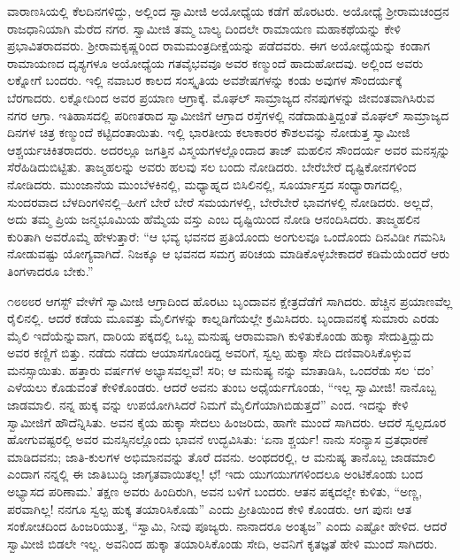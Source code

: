 ವಾರಾಣಸಿಯಲ್ಲಿ ಕೆಲದಿನಗಳಿದ್ದು, ಅಲ್ಲಿಂದ ಸ್ವಾಮೀಜಿ ಅಯೋಧ್ಯೆಯ ಕಡೆಗೆ ಹೊರಟರು. ಅಯೋಧ್ಯೆ ಶ್ರೀರಾಮಚಂದ್ರನ ರಾಜಧಾನಿಯಾಗಿ ಮೆರೆದ ನಗರ. ಸ್ವಾಮೀಜಿ ತಮ್ಮ ಬಾಲ್ಯ ದಿಂದಲೇ ರಾಮಾಯಣ ಮಹಾಕಥೆಯನ್ನು ಕೇಳಿ ಪ್ರಭಾವಿತರಾದವರು. ಶ್ರೀರಾಮಕೃಷ್ಣರಿಂದ ರಾಮಮಂತ್ರದೀಕ್ಷೆಯನ್ನು ಪಡೆದವರು. ಈಗ ಅಯೋಧ್ಯೆಯನ್ನು ಕಂಡಾಗ ರಾಮಾಯಣದ ದೃಶ್ಯಗಳೂ ಅಯೋಧ್ಯೆಯ ಗತವೈಭವವೂ ಅವರ ಕಣ್ಮುಂದೆ ಹಾದುಹೋದವು. ಅಲ್ಲಿಂದ ಅವರು ಲಕ್ನೋಗೆ ಬಂದರು. ಇಲ್ಲಿ ನವಾಬರ ಕಾಲದ ಸಂಸ್ಕೃತಿಯ ಅವಶೇಷಗಳನ್ನು ಕಂಡು ಅವುಗಳ ಸೌಂದರ್ಯಕ್ಕೆ ಬೆರಗಾದರು. ಲಕ್ನೋದಿಂದ ಅವರ ಪ್ರಯಾಣ ಆಗ್ರಾಕ್ಕೆ. ಮೊಘಲ್ ಸಾಮ್ರಾಜ್ಯದ ನೆನಪುಗಳನ್ನು ಜೀವಂತವಾಗಿಸಿರುವ ನಗರ ಆಗ್ರಾ. ಇತಿಹಾಸದಲ್ಲಿ ಪರಿಣತರಾದ ಸ್ವಾಮೀಜಿಗೆ ಆಗ್ರಾದ ರಸ್ತೆಗಳಲ್ಲಿ ನಡೆದಾಡುತ್ತಿದ್ದಂತೆ ಮೊಘಲ್ ಸಾಮ್ರಾಜ್ಯದ ದಿನಗಳ ಚಿತ್ರ ಕಣ್ಮುಂದೆ ಕಟ್ಟಿದಂತಾಯಿತು. ಇಲ್ಲಿ ಭಾರತೀಯ ಕಲಾಕಾರರ ಕೌಶಲವನ್ನು ನೋಡುತ್ತ ಸ್ವಾಮೀಜಿ ಆಶ್ಚರ್ಯಚಿಕಿತರಾದರು. ಅದರಲ್ಲೂ ಜಗತ್ತಿನ ವಿಸ್ಮಯಗಳಲ್ಲೊಂದಾದ ತಾಜ್ ಮಹಲಿನ ಸೌಂದರ್ಯ ಅವರ ಮನಸ್ಸನ್ನು ಸೆರೆಹಿಡಿದುಬಿಟ್ಟಿತು. ತಾಜ್ಮಹಲನ್ನು ಅವರು ಹಲವು ಸಲ ಬಂದು ನೋಡಿದರು. ಬೇರೆಬೇರೆ ದೃಷ್ಟಿಕೋನಗಳಿಂದ ನೋಡಿದರು. ಮುಂಜಾನೆಯ ಮುಂಬೆಳಕಿನಲ್ಲಿ, ಮಧ್ಯಾಹ್ನದ ಬಿಸಿಲಿನಲ್ಲಿ, ಸೂರ್ಯಾಸ್ತದ ಸಂಧ್ಯಾರಾಗದಲ್ಲಿ, ಸುಂದರವಾದ ಬೆಳದಿಂಗಳಿನಲ್ಲಿ–ಹೀಗೆ ಬೇರೆ ಬೇರೆ ಸಮಯಗಳಲ್ಲಿ, ಬೇರೆಬೇರೆ ಭಾವಗಳಲ್ಲಿ ನೋಡಿದರು. ಅಲ್ಲದೆ, ಅದು ತಮ್ಮ ಪ್ರಿಯ ಜನ್ಮಭೂಮಿಯ ಹೆಮ್ಮೆಯ ವಸ್ತು ಎಂಬ ದೃಷ್ಟಿಯಿಂದ ನೋಡಿ ಆನಂದಿಸಿದರು. ತಾಜ್ಮಹಲಿನ ಕುರಿತಾಗಿ ಅವರೊಮ್ಮೆ ಹೇಳುತ್ತಾರೆ: “ಆ ಭವ್ಯ ಭವನದ ಪ್ರತಿಯೊಂದು ಅಂಗುಲವೂ ಒಂದೊಂದು ದಿನವಿಡೀ ಗಮನಿಸಿ ನೋಡುವಷ್ಟು ಯೋಗ್ಯವಾಗಿದೆ. ನಿಜಕ್ಕೂ ಆ ಭವನದ ಸಮಗ್ರ ಪರಿಚಯ ಮಾಡಿಕೊಳ್ಳಬೇಕಾದರೆ ಕಡಿಮೆಯೆಂದರೆ ಆರು ತಿಂಗಳಾದರೂ ಬೇಕು.”

೧೮೮೮ರ ಆಗಸ್ಟ್ ವೇಳೆಗೆ ಸ್ವಾಮೀಜಿ ಆಗ್ರಾದಿಂದ ಹೊರಟು ಬೃಂದಾವನ ಕ್ಷೇತ್ರದೆಡೆಗೆ ಸಾಗಿದರು. ಹೆಚ್ಚಿನ ಪ್ರಯಾಣವೆಲ್ಲ ರೈಲಿನಲ್ಲಿ. ಆದರೆ ಕಡೆಯ ಮೂವತ್ತು ಮೈಲಿಗಳನ್ನು ಕಾಲ್ನಡಿಗೆಯಲ್ಲೇ ಕ್ರಮಿಸಿದರು. ಬೃಂದಾವನಕ್ಕೆ ಸುಮಾರು ಎರಡು ಮೈಲಿ ಇದೆಯೆನ್ನುವಾಗ, ದಾರಿಯ ಪಕ್ಕದಲ್ಲಿ ಒಬ್ಬ ಮನುಷ್ಯ ಆರಾಮವಾಗಿ ಕುಳಿತುಕೊಂಡು ಹುಕ್ಕಾ ಸೇದುತ್ತಿದ್ದುದು ಅವರ ಕಣ್ಣಿಗೆ ಬಿತ್ತು. ನಡೆದು ನಡೆದು ಆಯಾಸಗೊಂಡಿದ್ದ ಅವರಿಗೆ, ಸ್ವಲ್ಪ ಹುಕ್ಕಾ ಸೇದಿ ದಣಿವಾರಿಸಿಕೊಳ್ಳುವ ಮನಸ್ಸಾಯಿತು. ಹತ್ತಾರು ವರ್ಷಗಳ ಅಭ್ಯಾಸವಲ್ಲವೆ! ಸರಿ; ಆ ಮನುಷ್ಯ ನನ್ನು ಮಾತಾಡಿಸಿ, ಒಂದರೆಡು ಸಲ ‘ದಂ’ ಎಳೆಯಲು ಕೊಡುವಂತೆ ಕೇಳಿಕೊಂಡರು. ಆದರೆ ಅವನು ತುಂಬ ಅಧೈರ್ಯಗೊಂಡು, “ಇಲ್ಲ ಸ್ವಾಮೀಜಿ! ನಾನೊಬ್ಬ ಜಾಡಮಾಲಿ. ನನ್ನ ಹುಕ್ಕ ವನ್ನು ಉಪಯೋಗಿಸಿದರೆ ನಿಮಗೆ ಮೈಲಿಗೆಯಾಗಿಬಿಡುತ್ತದೆ” ಎಂದ. ಇದನ್ನು ಕೇಳಿ ಸ್ವಾಮೀಜಿಗೆ ಹೌದೆನ್ನಿಸಿತು. ಅವನ ಕೈಯ ಹುಕ್ಕಾ ಸೇದಲು ಹಿಂಜರಿದು, ಹಾಗೇ ಮುಂದೆ ಸಾಗಿದರು. ಆದರೆ ಸ್ವಲ್ಪದೂರ ಹೋಗುವಷ್ಟರಲ್ಲಿ ಅವರ ಮನಸ್ಸಿನಲ್ಲೊಂದು ಭಾವನೆ ಉದ್ಭವಿಸಿತು: ‘ಏನಾ ಶ್ಚರ್ಯ! ನಾನು ಸಂನ್ಯಾಸ ವ್ರತಧಾರಣೆ ಮಾಡಿದವನು; ಜಾತಿ-ಕುಲಗಳ ಅಭಿಮಾನವನ್ನು ತೊರೆ ದವನು. ಅಂಥದರಲ್ಲಿ, ಆ ಮನುಷ್ಯ ತಾನೊಬ್ಬ ಜಾಡಮಾಲಿ ಎಂದಾಗ ನನ್ನಲ್ಲಿ ಈ ಜಾತಿಬುದ್ಧಿ ಜಾಗೃತವಾಯಿತಲ್ಲ! ಛೆ! ಇದು ಯುಗಯುಗಗಳಿಂದಲೂ ಅಂಟಿಕೊಂಡು ಬಂದ ಅಭ್ಯಾಸದ ಪರಿಣಾಮ.’ ತಕ್ಷಣ ಅವರು ಹಿಂದಿರುಗಿ, ಅವನ ಬಳಿಗೆ ಬಂದರು. ಆತನ ಪಕ್ಕದಲ್ಲೇ ಕುಳಿತು, “ಅಣ್ಣ, ಪರವಾಗಿಲ್ಲ! ನನಗೂ ಸ್ವಲ್ಪ ಹುಕ್ಕ ತಯಾರಿಸಿಕೊಡು” ಎಂದು ಪ್ರೀತಿಯಿಂದ ಕೇಳಿ ಕೊಂಡರು. ಆಗ ಪುನಃ ಆತ ಸಂಕೋಚದಿಂದ ಹಿಂಜರಿಯುತ್ತ, “ಸ್ವಾಮಿ, ನೀವು ಪೂಜ್ಯರು. ನಾನಾದರೂ ಅಂತ್ಯಜ” ಎಂದು ಎಷ್ಟೋ ಹೇಳಿದ. ಆದರೆ ಸ್ವಾಮೀಜಿ ಬಿಡಲೇ ಇಲ್ಲ. ಅವನಿಂದ ಹುಕ್ಕಾ ತಯಾರಿಸಿಕೊಂಡು ಸೇದಿ, ಅವನಿಗೆ ಕೃತಜ್ಞತೆ ಹೇಳಿ ಮುಂದೆ ಸಾಗಿದರು.

